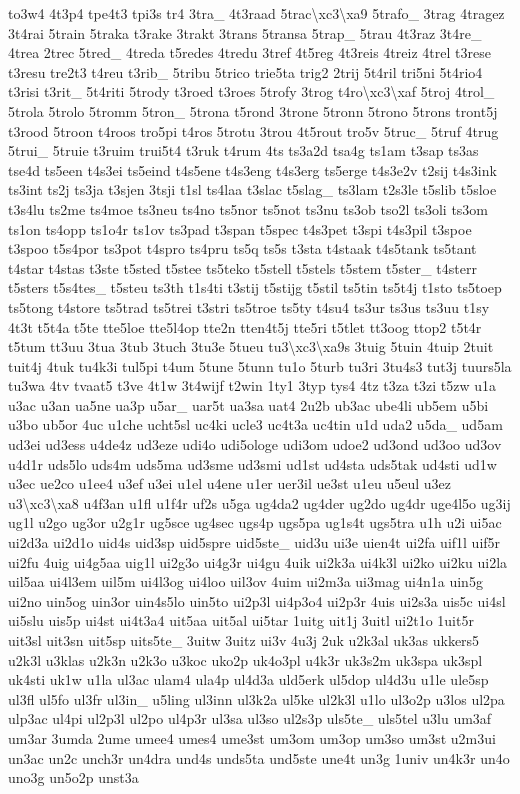 \begin{DoxyCompactItemize}
to3w4 4t3p4 tpe4t3 tpi3s tr4 3tra\-\_\- 4t3raad 5trac\textbackslash{}xc3\textbackslash{}xa9 5trafo\-\_\- 3trag 4tragez 3t4rai 5train 5traka t3rake 3trakt 3trans 5transa 5trap\-\_\- 5trau 4t3raz 3t4re\-\_\- 4trea 2trec 5tred\-\_\- 4treda t5redes 4tredu 3tref 4t5reg 4t3reis 4treiz 4trel t3rese t3resu tre2t3 t4reu t3rib\-\_\- 5tribu 5trico trie5ta trig2 2trij 5t4ril tri5ni 5t4rio4 t3risi t3rit\-\_\- 5t4riti 5trody t3roed t3roes 5trofy 3trog t4ro\textbackslash{}xc3\textbackslash{}xaf 5troj 4trol\-\_\- 5trola 5trolo 5tromm 5tron\-\_\- 5trona t5rond 3trone 5tronn 5trono 5trons tront5j t3rood 5troon t4roos tro5pi t4ros 5trotu 3trou 4t5rout tro5v 5truc\-\_\- 5truf 4trug 5trui\-\_\- 5truie t3ruim trui5t4 t3ruk t4rum 4ts ts3a2d tsa4g ts1am t3sap ts3as tse4d ts5een t4s3ei ts5eind t4s5ene t4s3eng t4s3erg ts5erge t4s3e2v t2sij t4s3ink ts3int ts2j ts3ja t3sjen 3tsji t1sl ts4laa t3slac t5slag\-\_\- ts3lam t2s3le t5slib t5sloe t3s4lu ts2me ts4moe ts3neu ts4no ts5nor ts5not ts3nu ts3ob tso2l ts3oli ts3om ts1on ts4opp ts1o4r ts1ov ts3pad t3span t5spec t4s3pet t3spi t4s3pil t3spoe t3spoo t5s4por ts3pot t4spro ts4pru ts5q ts5s t3sta t4staak t4s5tank ts5tant t4star t4stas t3ste t5sted t5stee ts5teko t5stell t5stels t5stem t5ster\-\_\- t4sterr t5sters t5s4tes\-\_\- t5steu ts3th t1s4ti t3stij t5stijg t5stil ts5tin ts5t4j t1sto ts5toep ts5tong t4store ts5trad ts5trei t3stri ts5troe ts5ty t4su4 ts3ur ts3us ts3uu t1sy 4t3t t5t4a t5te tte5loe tte5l4op tte2n tten4t5j tte5ri t5tlet tt3oog ttop2 t5t4r t5tum tt3uu 3tua 3tub 3tuch 3tu3e 5tueu tu3\textbackslash{}xc3\textbackslash{}xa9s 3tuig 5tuin 4tuip 2tuit tuit4j 4tuk tu4k3i tul5pi t4um 5tune 5tunn tu1o 5turb tu3ri 3tu4s3 tut3j tuurs5la tu3wa 4tv tvaat5 t3ve 4t1w 3t4wijf t2win 1ty1 3typ tys4 4tz t3za t3zi t5zw u1a u3ac u3an ua5ne ua3p u5ar\-\_\- uar5t ua3sa uat4 2u2b ub3ac ube4li ub5em u5bi u3bo ub5or 4uc u1che ucht5sl uc4ki ucle3 uc4t3a uc4tin u1d uda2 u5da\-\_\- ud5am ud3ei ud3ess u4de4z ud3eze udi4o udi5ologe udi3om udoe2 ud3ond ud3oo ud3ov u4d1r uds5lo uds4m uds5ma ud3sme ud3smi ud1st ud4sta uds5tak ud4sti ud1w u3ec ue2co u1ee4 u3ef u3ei u1el u4ene u1er uer3il ue3st u1eu u5eul u3ez u3\textbackslash{}xc3\textbackslash{}xa8 u4f3an u1fl u1f4r uf2s u5ga ug4da2 ug4der ug2do ug4dr uge4l5o ug3ij ug1l u2go ug3or u2g1r ug5sce ug4sec ugs4p ugs5pa ug1s4t ugs5tra u1h u2i ui5ac ui2d3a ui2d1o uid4s uid3sp uid5spre uid5ste\-\_\- uid3u ui3e uien4t ui2fa uif1l uif5r ui2fu 4uig ui4g5aa uig1l ui2g3o ui4g3r ui4gu 4uik ui2k3a ui4k3l ui2ko ui2ku ui2la uil5aa ui4l3em uil5m ui4l3og ui4loo uil3ov 4uim ui2m3a ui3mag ui4n1a uin5g ui2no uin5og uin3or uin4s5lo uin5to ui2p3l ui4p3o4 ui2p3r 4uis ui2s3a uis5c ui4sl ui5slu uis5p ui4st ui4t3a4 uit5aa uit5al ui5tar 1uitg uit1j 3uitl ui2t1o 1uit5r uit3sl uit3sn uit5sp uits5te\-\_\- 3uitw 3uitz ui3v 4u3j 2uk u2k3al uk3as ukkers5 u2k3l u3klas u2k3n u2k3o u3koc uko2p uk4o3pl u4k3r uk3s2m uk3spa uk3spl uk4sti uk1w u1la ul3ac ulam4 ula4p ul4d3a uld5erk ul5dop ul4d3u u1le ule5sp ul3fl ul5fo ul3fr ul3in\-\_\- u5ling ul3inn ul3k2a ul5ke ul2k3l u1lo ul3o2p u3los ul2pa ulp3ac ul4pi ul2p3l ul2po ul4p3r ul3sa ul3so ul2s3p uls5te\-\_\- uls5tel u3lu um3af um3ar 3umda 2ume umee4 umes4 ume3st um3om um3op um3so um3st u2m3ui un3ac un2c unch3r un4dra und4s unds5ta und5ste une4t un3g 1univ un4k3r un4o uno3g un5o2p unst3a 
\end{DoxyCompactItemize}
